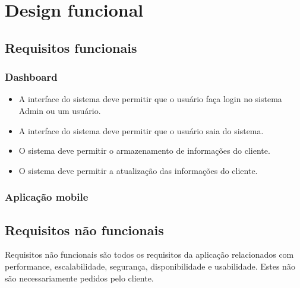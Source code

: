 \newpage

\section{Design funcional}










\subsection{Requisitos funcionais}







\subsubsection{Dashboard}


\begin{itemize}
	\item A interface do sistema deve permitir que o usuário faça login no sistema
	Admin ou um usuário.
	
	\item A interface do sistema deve permitir que o usuário saia do sistema.
	
	\item O sistema deve permitir o armazenamento de informações do cliente.
	
	\item O sistema deve permitir a atualização das informações do cliente.
\end{itemize}


\subsubsection{Aplicação mobile}





\subsection{Requisitos não funcionais}


Requisitos não funcionais são todos os requisitos da aplicação relacionados com
performance, escalabilidade, segurança, disponibilidade e usabilidade. Estes não são
necessariamente pedidos pelo cliente. 


